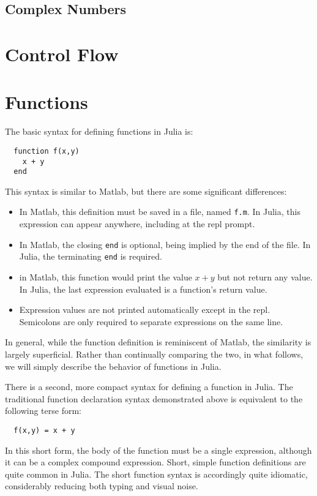 \documentclass{article}
\begin{document}
\subsection{Complex Numbers}

\section{Control Flow}



\section{Functions}

The basic syntax for defining functions in Julia is:
\begin{verbatim}
  function f(x,y)
    x + y
  end
\end{verbatim}
This syntax is similar to Matlab, but there are some significant differences:
\begin{itemize}
\item In Matlab, this definition must be saved in a file, named \verb|f.m|.
In Julia, this expression can appear anywhere, including at the repl prompt.
\item In Matlab, the closing \verb|end| is optional, being implied by the end of the file.
In Julia, the terminating \verb|end| is required.
\item in Matlab, this function would print the value $x + y$ but not return any value.
In Julia, the last expression evaluated is a function's return value.
\item Expression values are not printed automatically except in the repl.
Semicolons are only required to separate expressions on the same line.
\end{itemize}
In general, while the function definition is reminiscent of Matlab, the similarity is largely superficial.
Rather than continually comparing the two, in what follows, we will simply describe the behavior of functions in Julia.

There is a second, more compact syntax for defining a function in Julia.
The traditional function declaration syntax demonstrated above is equivalent to the following terse form:
\begin{verbatim}
  f(x,y) = x + y
\end{verbatim}
In this short form, the body of the function must be a single expression, although it can be a complex compound expression.
Short, simple function definitions are quite common in Julia.
The short function syntax is accordingly quite idiomatic, considerably reducing both typing and visual noise.
\end{document}
